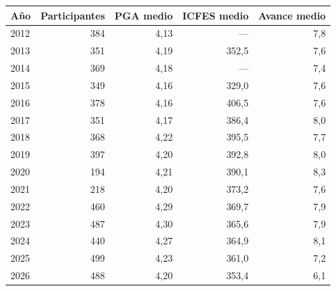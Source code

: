 \begin{tabular}{lrrrr}
\toprule
\textbf{Año} & \textbf{Participantes} & \textbf{PGA medio} & \textbf{ICFES medio} & \textbf{Avance medio} \\
\midrule
2012 & 384 & 4,13 & --- & 7,8 \\
2013 & 351 & 4,19 & 352,5 & 7,6 \\
2014 & 369 & 4,18 & --- & 7,4 \\
2015 & 349 & 4,16 & 329,0 & 7,6 \\
2016 & 378 & 4,16 & 406,5 & 7,6 \\
2017 & 351 & 4,17 & 386,4 & 8,0 \\
2018 & 368 & 4,22 & 395,5 & 7,7 \\
2019 & 397 & 4,20 & 392,8 & 8,0 \\
2020 & 194 & 4,21 & 390,1 & 8,3 \\
2021 & 218 & 4,20 & 373,2 & 7,6 \\
2022 & 460 & 4,29 & 369,7 & 7,9 \\
2023 & 487 & 4,30 & 365,6 & 7,9 \\
2024 & 440 & 4,27 & 364,9 & 8,1 \\
2025 & 499 & 4,23 & 361,0 & 7,2 \\
2026 & 488 & 4,20 & 353,4 & 6,1 \\
\bottomrule
\end{tabular}